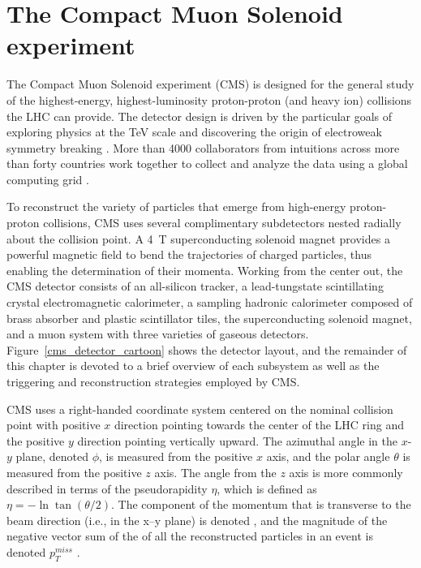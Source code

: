 \section{The Compact Muon Solenoid experiment}
\label{cms}
The Compact Muon Solenoid experiment (CMS) is designed for the general study of the highest-energy, highest-luminosity proton-proton (and heavy ion) collisions the LHC can provide. The detector design is driven by the particular goals of exploring physics at the \si{\TeV} scale and discovering the origin of electroweak symmetry breaking \cite{cms_tdr_v2}. More than 4000 collaborators from intuitions across more than forty countries work together to collect and analyze the data using a global computing grid \cite{cms_collaboration}.

To reconstruct the variety of particles that emerge from high-energy proton-proton collisions, CMS uses several complimentary subdetectors nested radially about the collision point. A \SI{4}{\tesla} superconducting solenoid magnet provides a powerful magnetic field to bend the trajectories of charged particles, thus enabling the determination of their momenta. Working from the center out, the CMS detector consists of an all-silicon tracker, a lead-tungstate scintillating crystal electromagnetic calorimeter, a sampling hadronic calorimeter composed of brass absorber and plastic scintillator tiles, the superconducting solenoid magnet, and a muon system with three varieties of gaseous detectors. Figure~\ref{cms_detector_cartoon} shows the detector layout, and the remainder of this chapter is devoted to a brief overview of each subsystem as well as the triggering and reconstruction strategies employed by CMS.



CMS uses a right-handed coordinate system centered on the nominal collision point with positive $x$ direction pointing towards the center of the LHC ring and the positive $y$ direction pointing vertically upward. The azimuthal angle in the $x$-$y$ plane, denoted $\phi$, is measured from the positive $x$ axis, and the polar angle $\theta$ is measured from the positive $z$ axis. The angle from the $z$ axis is more commonly described in terms of the pseudorapidity $\eta$, which is defined as $\eta=-\ln\tan(\theta/2)$. The component of the momentum that is transverse to the beam direction (i.e., in the x--y plane) is denoted \pt, and the magnitude of the negative vector sum of the \pt of all the reconstructed particles in an event is denoted $p_{T}^{miss}$ \cite{cms_tdr_v1, cms_experiment}. 

